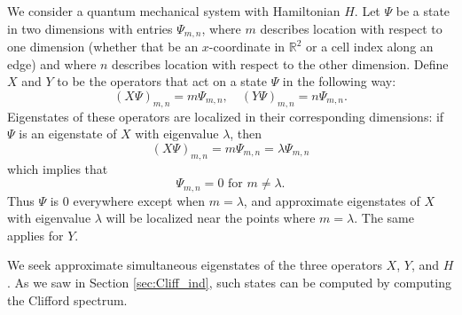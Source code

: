 \documentclass[a4paper]{article}
\begin{document}
We consider a quantum mechanical system with Hamiltonian $H$. Let $\Psi$ be a state in two dimensions with entries $\Psi_{m,n}$, where $m$ describes location with respect to one dimension (whether that be an $x$-coordinate in $\mathbb{R}^2$ or a cell index along an edge) and where $n$ describes location with respect to the other dimension.
Define $X$ and $Y$ to be the operators that act on a state $\Psi$ in the following way:
\begin{equation}\label{eq:xy}
(X \Psi)_{m,n} = m\Psi_{m,n}, \quad (Y \Psi)_{m,n} = n\Psi_{m,n}.
\end{equation}
Eigenstates of these operators are localized in their corresponding dimensions: if $\Psi$ is an eigenstate of $X$ with eigenvalue $\lambda$, then
\begin{equation}
(X \Psi)_{m,n} = m\Psi_{m,n} = \lambda\Psi_{m,n}
\end{equation}
which implies that
\begin{equation}
\Psi_{m,n} = 0 \text{ for } m \neq \lambda.
\end{equation}
Thus $\Psi$ is 0 everywhere except when $m = \lambda$, and approximate eigenstates of $X$ with eigenvalue $\lambda$ will be localized near the points where $m = \lambda$.
The same applies for $Y$.

We seek approximate simultaneous eigenstates of the three operators $X$, $Y$, and $H$. As we saw in Section \ref{sec:Cliff_ind}, such states can be computed by computing the Clifford spectrum.
\end{document}
